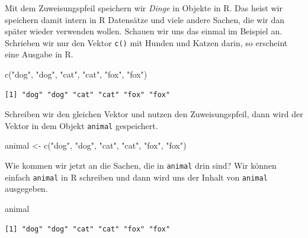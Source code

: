 \documentclass[
  letterpaper,
  DIV=11,
  oneside]{scrreport}
\newenvironment{Shaded}{\begin{snugshade}}{\end{snugshade}}
\newcommand{\FunctionTok}[1]{\textcolor[rgb]{0.28,0.35,0.67}{#1}}
\newcommand{\NormalTok}[1]{\textcolor[rgb]{0.00,0.23,0.31}{#1}}
\newcommand{\OtherTok}[1]{\textcolor[rgb]{0.00,0.23,0.31}{#1}}
\newcommand{\StringTok}[1]{\textcolor[rgb]{0.13,0.47,0.30}{#1}}
\begin{document}
Mit dem Zuweisungspfeil speichern wir \emph{Dinge} in Objekte in R. Das
heist wir speichern damit intern in R Datensätze und viele andere
Sachen, die wir dan später wieder verwenden wollen. Schauen wir uns das
einmal im Beispiel an. Schrieben wir nur den Vektor \texttt{c()} mit
Hunden und Katzen darin, so erscheint eine Ausgabe in R.

\begin{Shaded}
\begin{Highlighting}[]
\FunctionTok{c}\NormalTok{(}\StringTok{"dog"}\NormalTok{, }\StringTok{"dog"}\NormalTok{, }\StringTok{"cat"}\NormalTok{, }\StringTok{"cat"}\NormalTok{, }\StringTok{"fox"}\NormalTok{, }\StringTok{"fox"}\NormalTok{)}
\end{Highlighting}
\end{Shaded}

\begin{verbatim}
[1] "dog" "dog" "cat" "cat" "fox" "fox"
\end{verbatim}

Schreiben wir den gleichen Vektor und nutzen den Zuweisungspfeil, dann
wird der Vektor in dem Objekt \texttt{animal} gespeichert.

\begin{Shaded}
\begin{Highlighting}[]
\NormalTok{animal }\OtherTok{\textless{}{-}} \FunctionTok{c}\NormalTok{(}\StringTok{"dog"}\NormalTok{, }\StringTok{"dog"}\NormalTok{, }\StringTok{"cat"}\NormalTok{, }\StringTok{"cat"}\NormalTok{, }\StringTok{"fox"}\NormalTok{, }\StringTok{"fox"}\NormalTok{)}
\end{Highlighting}
\end{Shaded}

Wie kommen wir jetzt an die Sachen, die in \texttt{animal} drin sind?
Wir können einfach \texttt{animal} in R schreiben und dann wird uns der
Inhalt von \texttt{animal} ausgegeben.

\begin{Shaded}
\begin{Highlighting}[]
\NormalTok{animal}
\end{Highlighting}
\end{Shaded}

\begin{verbatim}
[1] "dog" "dog" "cat" "cat" "fox" "fox"
\end{verbatim}

{}
\end{document}
